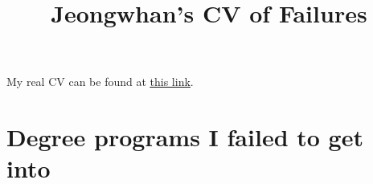 \documentclass[11pt,a4paper,sans]{moderncv}        %
\title{Jeongwhan’s CV of Failures}                               %
\begin{document}
\makecvtitle
My real CV can be found at \href{https://github.com/jeongwhanchoi/curriculum-vitae/blob/master/curriculum_vitae.pdf}{\underline{this link}}.
\section{Degree programs I failed to get into}
\end{document}
